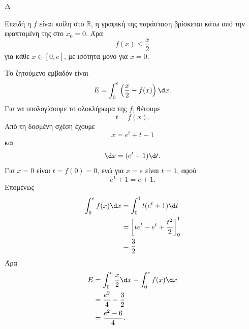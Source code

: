 \begin{thema}{Δ}
\begin{erwthma}
\item Επειδή η $f$ είναι κοίλη στο $\mathbb{R}$, η γραφική της παράσταση βρίσκεται κάτω από την εφαπτομένη της στο $x_0=0$. Άρα
\[
f(x)\leq\frac{x}{2}
\]
για κάθε $x\in[0,e]$, με ισότητα μόνο για $x=0$.

Το ζητούμενο εμβαδόν είναι
\[
E=\int_0^e\left(\frac{x}{2}-f(x)\right)\d x.
\]
Για να υπολογίσουμε το ολοκλήρωμα της $f$, θέτουμε
\[
t=f(x).
\]
Από τη δοσμένη σχέση έχουμε
\[
x=e^t+t-1
\]
και
\[
\d x=(e^t+1)\d t.
\]
Για $x=0$ είναι $t=f(0)=0$, ενώ για $x=e$ είναι $t=1$, αφού
\[
e^1+1=e+1.
\]
Επομένως
\begin{align*}
\int_0^e f(x)\d x
&=\int_0^1t(e^t+1)\d t\\
&=\left[te^t-e^t+\frac{t^2}{2}\right]_0^1\\
&=\frac{3}{2}.
\end{align*}
Άρα
\begin{align*}
E
&=\int_0^e\frac{x}{2}\d x-\int_0^ef(x)\d x\\
&=\frac{e^2}{4}-\frac{3}{2}\\
&={\frac{e^2-6}{4}}.
\end{align*}
\end{erwthma}
\end{thema}

